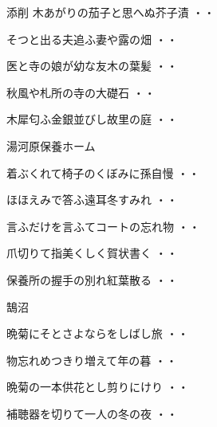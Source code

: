 \begin{shiika}添削 木あがりの茄子と思へぬ芥子漬
\hfill{・・}\end{shiika}
\begin{shiika}そつと出る夫追ふ妻や露の畑
\hfill{・・}\end{shiika}
\begin{shiika}医と寺の娘が幼な友木の葉髪
\hfill{・・}\end{shiika}
\begin{shiika}秋風や札所の寺の大礎石
\hfill{・・}\end{shiika}
\begin{shiika}木犀匂ふ金銀並びし故里の庭
\hfill{・・}\end{shiika}
\vspace{0.6cm}
湯河原保養ホーム
\begin{shiika}着ぶくれて椅子のくぼみに孫自慢
\hfill{・・}\end{shiika}
\begin{shiika}ほほえみで答ふ遠耳冬すみれ
\hfill{・・}\end{shiika}
\begin{shiika}言ふだけを言ふてコートの忘れ物
\hfill{・・}\end{shiika}
\begin{shiika}爪切りて指美くしく賀状書く
\hfill{・・}\end{shiika}
\begin{shiika}保養所の握手の別れ紅葉散る
\hfill{・・}\end{shiika}
\vspace{0.6cm}
鵠沼
\begin{shiika}晩菊にそとさよならをしばし旅
\hfill{・・}\end{shiika}
\begin{shiika}物忘れめつきり増えて年の暮
\hfill{・・}\end{shiika}
\begin{shiika}晩菊の一本供花とし剪りにけり
\hfill{・・}\end{shiika}
\begin{shiika}補聴器を切りて一人の冬の夜
\hfill{・・}\end{shiika}
